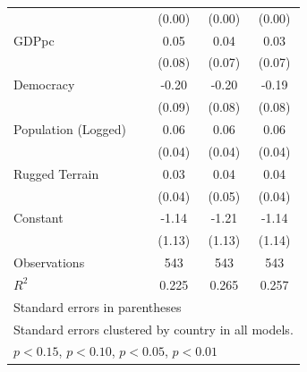 \documentclass[12pt, letterpaper]{article}
\begin{document}
\begin{table}[htbp]
\begin{small}
\begin{tabular}{l*{3}{c}}
                    &      (0.00)         &      (0.00)         &      (0.00)         \\
GDPpc               &        0.05         &        0.04         &        0.03         \\
                    &      (0.08)         &      (0.07)         &      (0.07)         \\
Democracy           &       -0.20\sym{**} &       -0.20\sym{**} &       -0.19\sym{**} \\
                    &      (0.09)         &      (0.08)         &      (0.08)         \\
Population (Logged) &        0.06\sym{+}  &        0.06\sym{+}  &        0.06\sym{+}  \\
                    &      (0.04)         &      (0.04)         &      (0.04)         \\
Rugged Terrain      &        0.03         &        0.04         &        0.04         \\
                    &      (0.04)         &      (0.05)         &      (0.04)         \\
Constant            &       -1.14         &       -1.21         &       -1.14         \\
                    &      (1.13)         &      (1.13)         &      (1.14)         \\
\hline
Observations        &         543         &         543         &         543         \\
\(R^{2}\)           &       0.225         &       0.265         &       0.257         \\
\hline\hline
\multicolumn{4}{l}{\footnotesize Standard errors in parentheses}\\
\multicolumn{4}{l}{\footnotesize Standard errors clustered by country in all models.}\\
\multicolumn{4}{l}{\footnotesize \sym{+} \(p<0.15\), \sym{*} \(p<0.10\), \sym{**} \(p<0.05\), \sym{***} \(p<0.01\)}\\
\end{tabular}
\end{small}
\end{table}
\end{document}
